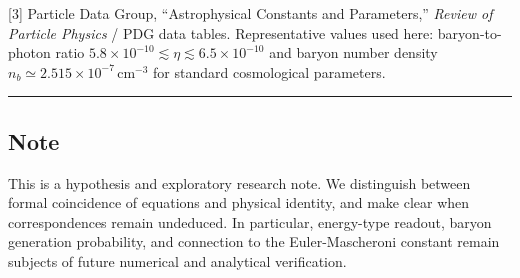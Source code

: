 \documentclass[
  a4paper,
]{article}
\begin{document}
{[}3{]} Particle Data Group, ``Astrophysical Constants and Parameters,''
\emph{Review of Particle Physics} / PDG data tables. Representative
values used here: baryon-to-photon ratio
\(5.8\times10^{-10}\lesssim\eta\lesssim6.5\times10^{-10}\) and baryon
number density \(n_b\simeq2.515\times10^{-7}\,\mathrm{cm}^{-3}\) for
standard cosmological parameters.

\begin{center}\rule{0.5\linewidth}{0.5pt}\end{center}

\subsection{Note}\label{note}

This is a hypothesis and exploratory research note. We distinguish
between formal coincidence of equations and physical identity, and make
clear when correspondences remain undeduced. In particular, energy-type
readout, baryon generation probability, and connection to the
Euler-Mascheroni constant remain subjects of future numerical and
analytical verification.
\end{document}
